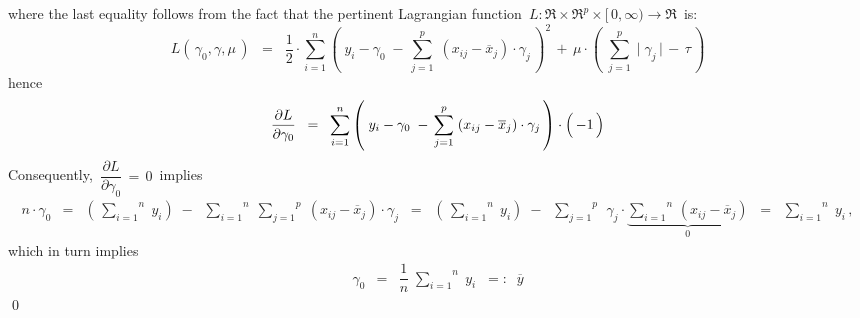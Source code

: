 where the last equality follows from the fact that the pertinent Lagrangian function
\,$L : \Re \times \Re^{p} \times [\,0,\infty) \longrightarrow \Re$\,
is:
\begin{equation*}
L(\,\gamma_{0},\gamma,\mu\,)
\;\; = \;\;
	\dfrac{1}{2}\cdot
	\overset{n}{\underset{i=1}{\sum}}
	\left(\; y_{i} - \gamma_{0} \;-\, \overset{p}{\underset{j=1}{\sum}}\; (x_{ij}-\overline{x}_{j})\cdot\gamma_{j}\,\right)^{2}
	\, + \,
	\mu\cdot\left(\;
		\overset{p}{\underset{j=1}{\sum}}\;
		\vert\;\gamma_{j}\,\vert
		\,-\, \tau 
		\,\right)
\end{equation*}
hence
\begin{equation*}
\dfrac{\partial L}{\partial\gamma_{0}}
\;\; = \;\;
	\overset{n}{\underset{i=1}{\sum}}
	\left(\; y_{i} - \gamma_{0} \;-\, \overset{p}{\underset{j=1}{\sum}}\; (x_{ij}-\overline{x}_{j})\cdot\gamma_{j}\,\right)
	\cdot\left(\,\overset{{\color{white}.}}{-1}\,\right)
\end{equation*}
Consequently, \,$\dfrac{\partial L}{\partial\gamma_{0}} \, = \, 0$\, implies
\begin{eqnarray*}
n\cdot\gamma_{0}
& = &
	\left(\, \overset{n}{\underset{i=1}{\sum}}\; y_{i} \right)
	\;-\;\;
	\overset{n}{\underset{i=1}{\sum}}\;
	\overset{p}{\underset{j=1}{\sum}}\;
	(x_{ij}-\overline{x}_{j})\cdot\gamma_{j}
\;\; = \;\;
	\left(\, \overset{n}{\underset{i=1}{\sum}}\; y_{i} \right)
	\;-\;\;
	\overset{p}{\underset{j=1}{\sum}}\;\,
	\gamma_{j}\cdot
	\underset{0}{\underbrace{\overset{n}{\underset{i=1}{\sum}}\,(x_{ij}-\overline{x}_{j})}}
\;\; = \;\;
	\overset{n}{\underset{i=1}{\sum}}\; y_{i}\,,
\end{eqnarray*}
which in turn implies
\begin{eqnarray*}
\gamma_{0}
& = &
	\dfrac{1}{n}\;\overset{n}{\underset{i=1}{\sum}}\; y_{i}
\;\; =: \;\;
	\overline{y}
\end{eqnarray*}
\qed


